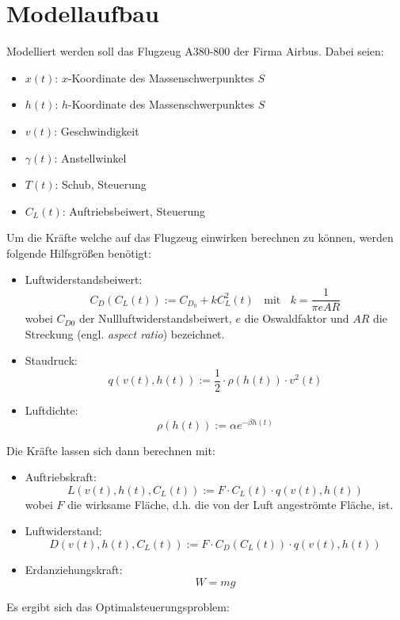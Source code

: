 \chapter{Modellaufbau}
Modelliert werden soll das Flugzeug A380-800 der Firma Airbus. Dabei seien:
\begin{itemize}
\item $x(t)$: $x$-Koordinate des Massenschwerpunktes $S$
%
\item $h(t)$: $h$-Koordinate des Massenschwerpunktes $S$
%
\item $v(t)$: Geschwindigkeit
%
\item $\gamma(t)$: Anstellwinkel
%
\item $T(t)$: Schub, Steuerung
%
\item $C_L(t)$: Auftriebsbeiwert, Steuerung
\end{itemize}
Um die Kräfte welche auf das Flugzeug einwirken berechnen zu können, werden folgende Hilfsgrößen benötigt:
\begin{itemize}
\item Luftwiderstandsbeiwert: \[C_D(C_L(t)) := C_{D_0} + k C^2_L(t) \ \ \ \ \text{mit} \ \ \ \ k = \dfrac{1}{\pi e AR}\] wobei $C_{D0}$ der Nullluftwiderstandsbeiwert, $e$ die Oswaldfaktor und $AR$ die Streckung (engl. \textit{aspect ratio}) bezeichnet.
%
\item Staudruck: \[q(v(t), h(t)) := \dfrac{1}{2} \cdot \rho(h(t)) \cdot v^2(t)\]
%
\item Luftdichte: \[\rho(h(t)) := \alpha e^{-\beta h(t)}\]
\end{itemize}
Die Kräfte lassen sich dann berechnen mit:
\begin{itemize}
\item Auftriebskraft: \[L(v(t), h(t), C_L(t)) := F \cdot C_L(t) \cdot q(v(t), h(t))\] wobei $F$ die wirksame Fläche, d.h. die von der Luft angeströmte Fläche, ist.
%
\item Luftwiderstand: \[D(v(t), h(t), C_L(t)) := F \cdot C_D(C_L(t)) \cdot q(v(t), h(t))\]
\item Erdanziehungskraft: \[W = mg\]
\end{itemize}
Es ergibt sich das Optimalsteuerungsproblem:
